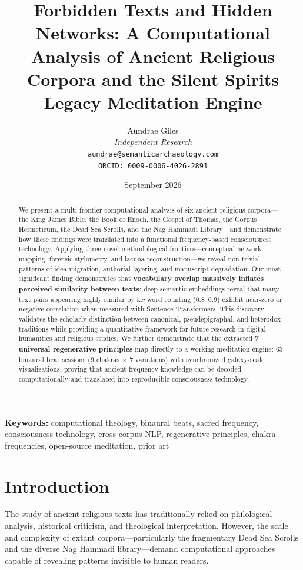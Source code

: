 \documentclass[11pt]{article}
\title{Forbidden Texts and Hidden Networks: A Computational Analysis of Ancient Religious Corpora and the Silent Spirits Legacy Meditation Engine}
\author{Aundrae Giles\\
  \textit{Independent Research}\\
  \texttt{aundrae@semanticarchaeology.com}\\
  \texttt{ORCID: 0009-0006-4026-2891}
}
\date{September 2026}
\begin{document}
\maketitle

\begin{abstract}
We present a multi-frontier computational analysis of six ancient religious corpora---the King James Bible, the Book of Enoch, the Gospel of Thomas, the Corpus Hermeticum, the Dead Sea Scrolls, and the Nag Hammadi Library---and demonstrate how these findings were translated into a functional frequency-based consciousness technology. Applying three novel methodological frontiers---conceptual network mapping, forensic stylometry, and lacuna reconstruction---we reveal non-trivial patterns of idea migration, authorial layering, and manuscript degradation. Our most significant finding demonstrates that \textbf{vocabulary overlap massively inflates perceived similarity between texts}: deep semantic embeddings reveal that many text pairs appearing highly similar by keyword counting (0.8--0.9) exhibit near-zero or negative correlation when measured with Sentence-Transformers. This discovery validates the scholarly distinction between canonical, pseudepigraphal, and heterodox traditions while providing a quantitative framework for future research in digital humanities and religious studies. We further demonstrate that the extracted \textbf{7 universal regenerative principles} map directly to a working meditation engine: 63 binaural beat sessions (9 chakras $\times$ 7 variations) with synchronized galaxy-scale visualizations, proving that ancient frequency knowledge can be decoded computationally and translated into reproducible consciousness technology.
\end{abstract}

\textbf{Keywords:} computational theology, binaural beats, sacred frequency, consciousness technology, cross-corpus NLP, regenerative principles, chakra frequencies, open-source meditation, prior art

\section{Introduction}

The study of ancient religious texts has traditionally relied on philological analysis, historical criticism, and theological interpretation. However, the scale and complexity of extant corpora---particularly the fragmentary Dead Sea Scrolls and the diverse Nag Hammadi library---demand computational approaches capable of revealing patterns invisible to human readers.
\end{document}
